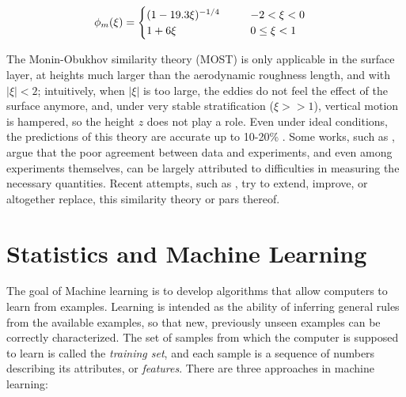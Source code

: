\documentclass[a4paper,11pt]{kth-mag}
\begin{document}
\begin{align}
\phi_m(\xi)&=\begin{cases}
\label{eq:phi_m_coeff}
\mathrlap{(1-19.3\xi)^{-1/4}} \hphantom{0.95(1-11.6\xi)^{-1/2}} & -2<\xi<0 \\
1+6\xi & 0\leq\xi<1\\
\end{cases}
\end{align}

The Monin-Obukhov similarity theory (MOST) is only applicable in the surface layer, at heights much larger than the aerodynamic roughness length, and with $\vert\xi\vert<2$; intuitively, when $\vert\xi\vert$ is too large, the eddies do not feel the effect of the surface anymore, and, under very stable stratification ($\xi>>1$), vertical motion is hampered, so the height $z$ does not play a role. Even under ideal conditions, the predictions of this theory are accurate up to 10-20\% \citep{50years}. Some works, such as \cite{flux_prof_measure_issues}, argue that the poor agreement between data and experiments, and even among experiments themselves, can be largely attributed to difficulties in measuring the necessary quantities. Recent attempts, such as \citep{sheba_phim,most_teal,Wilson2008,aerodynamic_fluxes}, try to extend, improve, or altogether replace, this similarity theory or pars thereof.

\section{Statistics and Machine Learning}
\label{sec:ml}
The goal of Machine learning is to develop algorithms that allow computers to learn from examples. Learning is intended as the ability of inferring general rules from the available examples, so that new, previously unseen examples can be correctly characterized. The set of samples from which the computer is supposed to learn is called the \emph{training set}, and each sample is a sequence of numbers describing its attributes, or \emph{features}. There are three approaches in machine learning:
\end{document}
